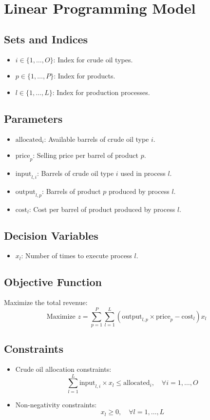 \documentclass{article}
\begin{document}
\section*{Linear Programming Model}

\subsection*{Sets and Indices}
\begin{itemize}
    \item $i \in \{1, \ldots, O\}$: Index for crude oil types.
    \item $p \in \{1, \ldots, P\}$: Index for products.
    \item $l \in \{1, \ldots, L\}$: Index for production processes.
\end{itemize}

\subsection*{Parameters}
\begin{itemize}
    \item $\text{allocated}_i$: Available barrels of crude oil type $i$.
    \item $\text{price}_p$: Selling price per barrel of product $p$.
    \item \(\text{input}_{l,i}\): Barrels of crude oil type $i$ used in process $l$.
    \item \(\text{output}_{l,p}\): Barrels of product $p$ produced by process $l$.
    \item \(\text{cost}_l\): Cost per barrel of product produced by process $l$.
\end{itemize}

\subsection*{Decision Variables}
\begin{itemize}
    \item \(x_l\): Number of times to execute process $l$.
\end{itemize}

\subsection*{Objective Function}
Maximize the total revenue:
\[
\text{Maximize } z = \sum_{p=1}^{P} \sum_{l=1}^{L} \left( \text{output}_{l,p} \times \text{price}_p - \text{cost}_l \right) x_l
\]

\subsection*{Constraints}
\begin{itemize}
    \item Crude oil allocation constraints:
    \[
    \sum_{l=1}^{L} \text{input}_{l,i} \times x_l \leq \text{allocated}_i, \quad \forall i = 1, \ldots, O
    \]
    \item Non-negativity constraints:
    \[
    x_l \geq 0, \quad \forall l = 1, \ldots, L
    \]
\end{itemize}
\end{document}
